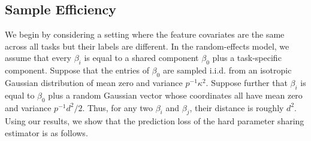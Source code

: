 
\subsection{Sample Efficiency}

We begin by considering a setting where the feature covariates are the same across all tasks but their labels are different.
In the random-effects model, we assume that every $\beta_i$ is equal to a shared component $\beta_0$ plus a task-specific component.
Suppose that the entries of $\beta_0$ are sampled i.i.d. from an isotropic Gaussian distribution of mean zero and variance $p^{-1}\kappa^2$.
Suppose further that $\beta_i$ is equal to $\beta_0$ plus a random Gaussian vector whose coordinates all have mean zero and variance $p^{-1} d^2 / 2$.
Thus, for any two $\beta_i$ and $\beta_j$, their distance is roughly $d^2$.
Using our results, we show that the prediction loss of the hard parameter sharing estimator is as follows.

